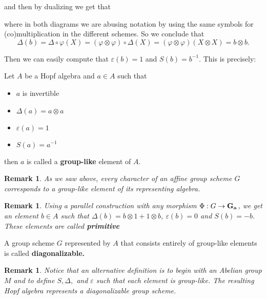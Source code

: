 \documentclass[12pt]{article}
\theoremstyle{nonumberbreak}
\theoremstyle{changebreak}
\theoremstyle{nonumberplain}
\theoremstyle{change}
\newtheorem{rmk}[thm]{Remark}
\newcommand{\Ga}{\ensuremath\mathbf{G_a}}
\begin{document}
\noindent and then by dualizing we get that
\newpage
\begin{figure}[h]
\end{figure}

\noindent where in both diagrams we are abusing notation by using the same symbols for 
(co)multiplication in the different schemes. So we conclude that 
\[\Delta(b)=\Delta\circ\varphi(X)=(\varphi\otimes\varphi)\circ \Delta(X)=(\varphi\otimes\varphi)(X\otimes X)=b\otimes b.\]

Then we can easily compute that $\varepsilon(b)=1$ and $S(b)=b^{-1}$. This is precisely:
\begin{defn}
	Let $A$ be a Hopf algebra and $a\in A$ such that
	\begin{itemize}
		\item $a$ is invertible
		\item $\Delta(a)=a\otimes a$
		\item $\varepsilon(a)=1$
		\item $S(a)=a^{-1}$
	\end{itemize}
	then $a$ is called a \textbf{group-like} element of $A$.
\end{defn}
\begin{rmk}
	As we saw above, every character of an affine group scheme $G$ corresponds to a 
	group-like element of its representing algebra.
\end{rmk}
\begin{rmk}
	Using a parallel construction with any morphism $\Phi:G\to\Ga$, we get an element $b\in A$
	such that $\Delta(b)=b\otimes 1+1\otimes b$, $\varepsilon(b)=0$ and $S(b)=-b$. These elements
	are called \textbf{primitive}
\end{rmk}

\begin{defn}
	A group scheme $G$ represented by $A$ that consists entirely of group-like elements is
	called \textbf{diagonalizable.}
\end{defn}
\begin{rmk}\label{rmk-diag}
	Notice that an alternative definition is to begin with an Abelian group $M$ and to 
	define $S,\Delta,$ and $\varepsilon$ such that each element is group-like. The resulting
	Hopf algebra represents a diagonalizable group scheme.
\end{rmk}
\end{document}

